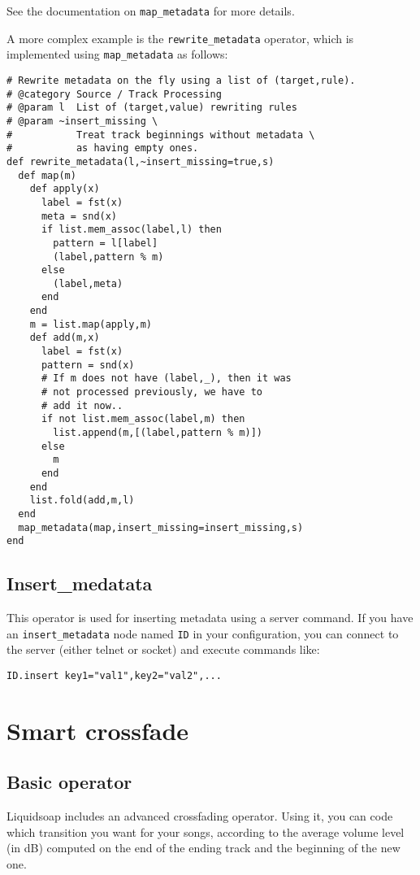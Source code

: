 See the documentation on \verb+map_metadata+ for more details.

A more complex example is the \verb+rewrite_metadata+ operator, which is implemented using \verb+map_metadata+ as follows:

\begin{verbatim}
# Rewrite metadata on the fly using a list of (target,rule).
# @category Source / Track Processing
# @param l  List of (target,value) rewriting rules
# @param ~insert_missing \
#           Treat track beginnings without metadata \
#           as having empty ones.
def rewrite_metadata(l,~insert_missing=true,s)
  def map(m)
    def apply(x)
      label = fst(x)
      meta = snd(x)
      if list.mem_assoc(label,l) then
        pattern = l[label]
        (label,pattern % m)
      else
        (label,meta)
      end
    end
    m = list.map(apply,m)
    def add(m,x)
      label = fst(x)
      pattern = snd(x)
      # If m does not have (label,_), then it was
      # not processed previously, we have to
      # add it now..
      if not list.mem_assoc(label,m) then
        list.append(m,[(label,pattern % m)])
      else
        m
      end
    end
    list.fold(add,m,l)
  end
  map_metadata(map,insert_missing=insert_missing,s)
end
\end{verbatim}
\subsection{Insert\_medatata}
This operator is used for inserting metadata using a server command. If you have an \verb+insert_metadata+ node named \verb+ID+ in your configuration, you can connect to the server (either telnet or socket) and execute commands like: 

\begin{verbatim}
ID.insert key1="val1",key2="val2",...
\end{verbatim}


\section{Smart crossfade}
\subsection{Basic operator}
Liquidsoap includes an advanced crossfading operator. Using it, you can code which transition you want for your songs, according to the average volume level (in dB) computed on the end of the ending track and the beginning of the new one.

